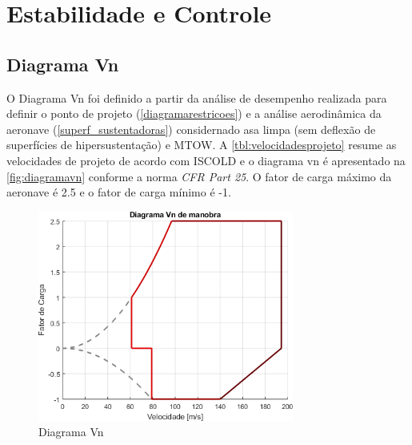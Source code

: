 \chapter{Estabilidade e Controle}
\label{estabilidade}

\section{Diagrama Vn}
\label{diagramavn}

O Diagrama Vn foi definido a partir da análise de desempenho realizada para definir o ponto de projeto (\autoref{diagramarestricoes}) e a análise aerodinâmica da aeronave (\autoref{superf_sustentadoras}) considernado asa limpa (sem deflexão de superfícies de hipersustentação) e MTOW. A \autoref{tbl:velocidadesprojeto} resume as velocidades de projeto de acordo com ISCOLD e o diagrama vn é apresentado na \autoref{fig:diagramavn} conforme a norma \textit{CFR Part 25}. O fator de carga máximo da aeronave é 2.5 e o fator de carga mínimo é -1.

\begin{figure}[H]
\centering
\includegraphics[width=0.75\textwidth]{images/parte3/diagramavn_asalimpa.png}
\caption[Diagrama Vn]{Diagrama Vn}
\label{fig:diagramavn}
\end{figure}

